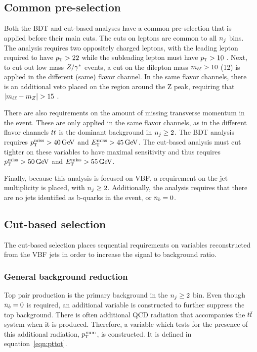 \subsection{Common pre-selection}
\label{sec:vbf_presel}
Both the BDT and cut-based analyses have a common pre-selection that is applied before their main cuts. The cuts on leptons are common to all $n_j$ bins. The analysis requires two oppositely charged leptons, with the leading lepton required to have $p_{\textrm{\footnotesize\sc t}} > 22$ \GeV while the subleading lepton must have $p_{\textrm{\footnotesize\sc t}} > 10$ \GeV. Next, to cut out low mass $Z/\gamma^{\ast}$ events, a cut on the dilepton mass $m_{\ell\ell} > 10$ (12) \GeV is applied in the different (same) flavor channel. In the same flavor channels, there is an additional veto placed on the region around the Z peak, requiring that $|m_{\ell\ell} - m_Z| > 15$ \GeV. 

There are also requirements on the amount of missing transverse momentum in the event. These are only applied in the same flavor channels, as in the different flavor channels $t\bar{t}$ is the dominant background in $n_j \geq 2$. The BDT analysis requires $\MPTj > 40 \GeV$ and $\MET > 45 \GeV$. The cut-based analysis must cut tighter on these variables to have maximal sensitivity and thus requires $\MPTj > 50 \GeV$ and $\MET > 55 \GeV$. 

Finally, because this analysis is focused on VBF, a requirement on the jet multiplicity is placed, with $n_j \geq 2$. Additionally, the analysis requires that there are no jets identified as b-quarks in the event, or $n_b = 0$. 



\subsection{Cut-based selection}

The cut-based selection places sequential requirements on variables reconstructed from the VBF jets in order to increase the signal to background ratio.

\subsubsection{General background reduction}

Top pair production is the primary background in the $n_j \geq 2$ bin. Even though $n_b = 0$ is required, an additional variable is constructed to further suppress the top background. There is often additional QCD radiation that accompanies the $t\bar{t}$ system when it is produced. Therefore, a variable which tests for the presence of this additional radiation, $p_{\textrm{\footnotesize\sc t}}^{\,\rm sum}$, is constructed. It is defined in equation~\ref{eqn:pttot}.

